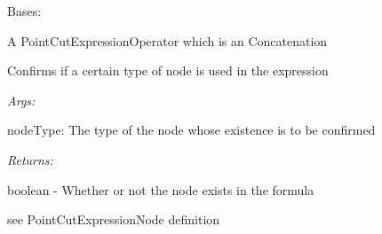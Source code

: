 \documentclass[letterpaper,10pt,english]{sphinxmanual}
\begin{document}
\begin{fulllineitems}
\label{modules/index:aosb.core.PointCutExpressionConcatenate}
Bases: {\hyperref[modules/index:aosb.core.PointCutExpressionOperator]{}}

A PointCutExpressionOperator which is an Concatenation

\begin{fulllineitems}
\label{modules/index:aosb.core.PointCutExpressionConcatenate.expressionUses}
Confirms if a certain type of node is used in the expression

\begin{DUlineblock}{0em}
\item[] \emph{Args:}
\item[]
\begin{DUlineblock}{\DUlineblockindent}
\item[] nodeType: The type of the node whose existence is to be confirmed
\end{DUlineblock}
\end{DUlineblock}

\begin{DUlineblock}{0em}
\item[] \emph{Returns:}
\item[]
\begin{DUlineblock}{\DUlineblockindent}
\item[] boolean - Whether or not the node exists in the formula
\end{DUlineblock}
\end{DUlineblock}

\end{fulllineitems}


\begin{fulllineitems}
\label{modules/index:aosb.core.PointCutExpressionConcatenate.match}
see PointCutExpressionNode definition

\end{fulllineitems}



\end{fulllineitems}
\end{document}
